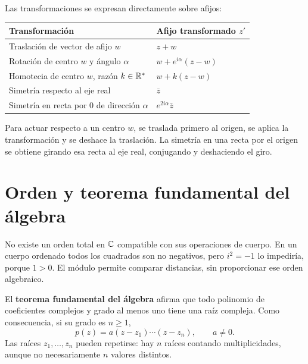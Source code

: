 Las transformaciones se expresan directamente sobre afijos:
\begin{center}
\begin{tabular}{@{}ll@{}}
\toprule
Transformación & Afijo transformado $z'$\\
\midrule
Traslación de vector de afijo $w$ & $z+w$\\
Rotación de centro $w$ y ángulo $\alpha$ & $w+e^{i\alpha}(z-w)$\\
Homotecia de centro $w$, razón $k\in\mathbb{R}^*$ & $w+k(z-w)$\\
Simetría respecto al eje real & $\bar z$\\
Simetría en recta por $0$ de dirección $\alpha$ & $e^{2i\alpha}\bar z$\\
\bottomrule
\end{tabular}
\end{center}
Para actuar respecto a un centro $w$, se traslada primero al origen,
se aplica la transformación y se deshace la traslación.
La simetría en una recta por el origen se obtiene girando esa recta al
eje real, conjugando y deshaciendo el giro.

\section{Orden y teorema fundamental del álgebra}
No existe un orden total en $\mathbb{C}$ compatible con sus operaciones de
cuerpo. En un cuerpo ordenado todos los cuadrados son no negativos,
pero $i^2=-1$ lo impediría, porque $1>0$.
El módulo permite comparar distancias, sin proporcionar ese orden algebraico.

El \textbf{teorema fundamental del álgebra} afirma que todo polinomio
de coeficientes complejos y grado al menos uno tiene una raíz compleja.
Como consecuencia, si su grado es $n\ge1$,
\[
 p(z)=a(z-z_1)\cdots(z-z_n),\qquad a\ne0.
\]
Las raíces $z_1,\ldots,z_n$ pueden repetirse: hay $n$ raíces contando
multiplicidades, aunque no necesariamente $n$ valores distintos.
